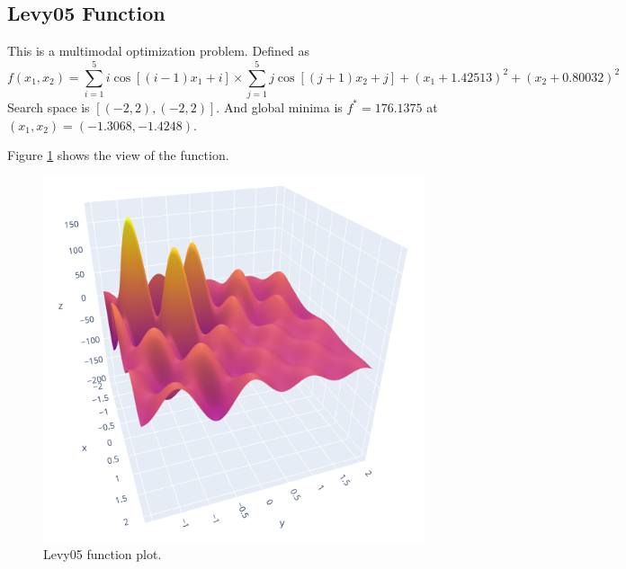 \subsection{Levy05 Function}
This is a multimodal optimization problem. Defined as
$$ f(x_1,x_2) = \sum_{i=1}^{5} i \cos[(i-1)x_1 + i] \times \sum_{j=1}^{5} j \cos[(j+1)x_2+j] + (x_1+1.42513)^2 + (x_2+0.80032)^2 $$
Search space is $[(-2, 2), (-2, 2)]$. And global minima is $f^*=176.1375$ at $(x_1, x_2)=(-1.3068, -1.4248)$. 

Figure \ref{fig:levy05-function-plot} shows the view of the function.
\begin{figure}[H]
	\centering
	\includegraphics[scale=0.5]{figures/levy05-function-plot.png}
	\caption{Levy05 function plot.}
	\label{fig:levy05-function-plot}
\end{figure}

